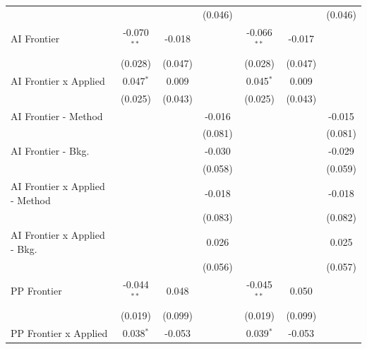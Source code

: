 \begin{tabular}{lcccccc}
                                  &                &               & (0.046)        &                &               & (0.046)\\   
   AI Frontier                    & -0.070$^{**}$  & -0.018        &                & -0.066$^{**}$  & -0.017        &   \\   
                                  & (0.028)        & (0.047)       &                & (0.028)        & (0.047)       &   \\   
   AI Frontier x Applied          & 0.047$^{*}$    & 0.009         &                & 0.045$^{*}$    & 0.009         &   \\   
                                  & (0.025)        & (0.043)       &                & (0.025)        & (0.043)       &   \\   
   AI Frontier - Method           &                &               & -0.016         &                &               & -0.015\\   
                                  &                &               & (0.081)        &                &               & (0.081)\\   
   AI Frontier - Bkg.             &                &               & -0.030         &                &               & -0.029\\   
                                  &                &               & (0.058)        &                &               & (0.059)\\   
   AI Frontier x Applied - Method &                &               & -0.018         &                &               & -0.018\\   
                                  &                &               & (0.083)        &                &               & (0.082)\\   
   AI Frontier x Applied - Bkg.   &                &               & 0.026          &                &               & 0.025\\   
                                  &                &               & (0.056)        &                &               & (0.057)\\   
   PP Frontier                    & -0.044$^{**}$  & 0.048         &                & -0.045$^{**}$  & 0.050         &   \\   
                                  & (0.019)        & (0.099)       &                & (0.019)        & (0.099)       &   \\   
   PP Frontier x Applied          & 0.038$^{*}$    & -0.053        &                & 0.039$^{*}$    & -0.053        &   \\   

\end{tabular}
